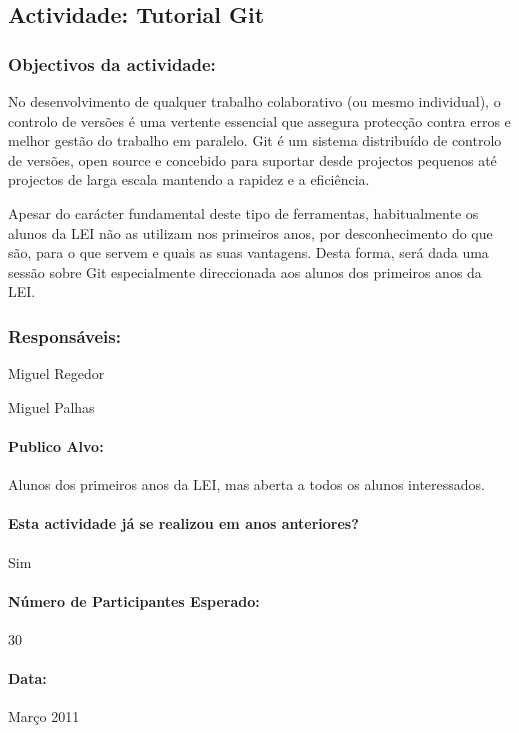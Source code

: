 \subsection{Actividade: Tutorial Git} %

\subsubsection*{Objectivos da actividade:}
No desenvolvimento de qualquer trabalho colaborativo (ou mesmo individual), o controlo de versões é uma vertente essencial que assegura protecção contra erros e melhor gestão do trabalho em paralelo. Git é um sistema distribuído de controlo de versões, open source e concebido para suportar desde projectos pequenos até projectos de larga escala mantendo a rapidez e a eficiência.

Apesar do carácter fundamental deste tipo de ferramentas, habitualmente os alunos da LEI não as utilizam nos primeiros anos, por desconhecimento do que são, para o que servem e quais as suas vantagens. Desta forma, será dada uma sessão sobre Git especialmente direccionada aos alunos dos primeiros anos da LEI.

\subsubsection*{Responsáveis:}
\begin{itemizedash}
	\item{Miguel Regedor}
	\item{Miguel Palhas}
\end{itemizedash}

\paragraph{Publico Alvo: }
Alunos dos primeiros anos da LEI, mas aberta a todos os alunos interessados.

\paragraph{Esta actividade já se realizou em anos anteriores?}
Sim

\paragraph{Número de Participantes Esperado:}
30

\paragraph{Data:} Março 2011

